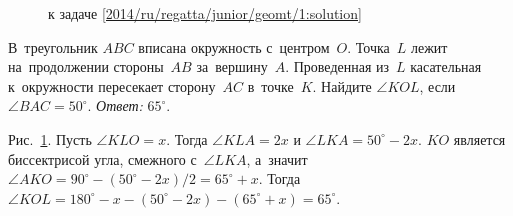 \ifsolution
\begin{figure}\centering
    \caption{к задаче \ref{2014/ru/regatta/junior/geomt/1:solution}}
    \label{2014/ru/regatta/junior/geomt/1:solution:fig}
\end{figure}%
\fi %

\problem
В~треугольник $ABC$ вписана окружность с~центром~$O$.
Точка~$L$ лежит на~продолжении стороны~$AB$ за~вершину~$A$.
Проведенная из~$L$ касательная к~окружности пересекает сторону~$AC$ в~точке~$K$.
Найдите $\angle KOL$, если $\angle BAC = 50^\circ$.
\solution
\label{2014/ru/regatta/junior/geomt/1:solution}%
\emph{Ответ:} $65^\circ$.
\par
Рис.~\ref{2014/ru/regatta/junior/geomt/1:solution:fig}.
Пусть $\angle KLO = x$.
Тогда $\angle KLA = 2x$ и $\angle LKA = 50^{\circ} - 2x$.
$KO$ является биссектрисой угла, смежного с~$\angle LKA$, а~значит
$\angle AKO = 90^{\circ} - (50^{\circ} - 2x) / 2 = 65^{\circ} + x$.
Тогда
\(
    \angle KOL
=
    180^{\circ} - x - (50^{\circ} - 2x) - (65^{\circ} + x)
=
    65^{\circ}
\).
\endproblem
